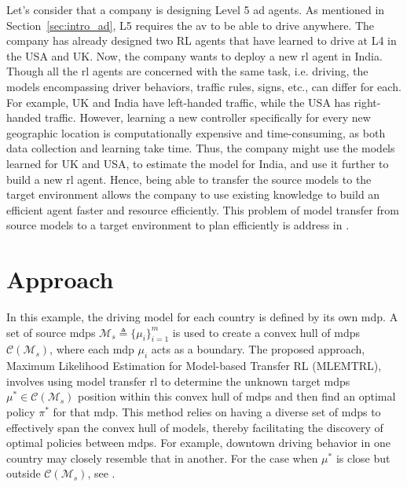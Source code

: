 Let's consider that a company is designing Level 5 \gls{ad} agents. As mentioned in Section~\ref{sec:intro_ad}, L5 requires the \gls{av} to be able to drive anywhere. The company has already designed two RL agents that have learned to drive at L4 in the USA and UK. Now, the company wants to deploy a new \gls{rl} agent in India. 
Though all the \gls{rl} agents are concerned with the same task, i.e. driving, the models encompassing driver behaviors, traffic rules, signs, etc., can differ for each. For example, UK and India have left-handed traffic, while the USA has right-handed traffic. However, learning a new controller specifically for every new geographic location is computationally expensive and time-consuming, as both data collection and learning take time. Thus, the company might use the models learned for UK and USA, to estimate the model for India, and use it further to build a new \gls{rl} agent. Hence, being able to transfer the source models to the target environment allows the company to use existing knowledge to build an efficient agent faster and resource efficiently. 
This problem of model transfer from source models to a target environment to plan efficiently is address in \paperTransfer. 

\section{Approach}
In this example, the driving model for each country is defined by its own \gls{mdp}. A set of source \gls{mdp}s $\mathcal{M}_s \triangleq \{\mu_i\}_{i=1}^m$ is used to create a convex hull of \gls{mdp}s $\mathcal{C}(\mathcal{M}_s)$, where each \gls{mdp} $\mu_i$ acts as a boundary. 
The proposed approach, Maximum Likelihood Estimation for Model-based Transfer RL (MLEMTRL), involves using model transfer \gls{rl} to determine the unknown target \gls{mdp}s $\mu^* \in \mathcal{C}(\mathcal{M}_s)$ position within this convex hull of \gls{mdp}s and then find an optimal policy $\pi^*$ for that \gls{mdp}. 
This method relies on having a diverse set of \gls{mdp}s to effectively span the convex hull of models, thereby facilitating the discovery of optimal policies between \gls{mdp}s. For example, downtown driving behavior in one country may closely resemble that in another. For the case when $\mu^*$ is close but outside $\mathcal{C}(\mathcal{M}_s)$, see \paperTransfer.



